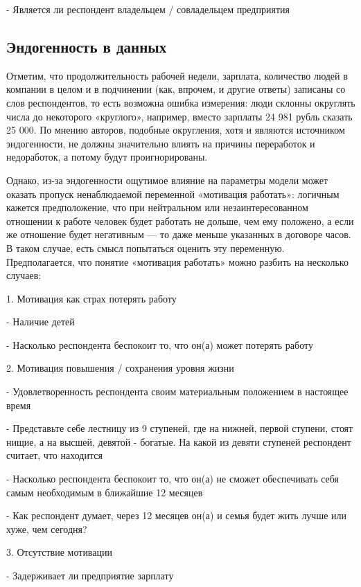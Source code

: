 \documentclass[12pt, a4paper]{article}
\begin{document}
{		-   Является ли респондент владельцем / совладельцем предприятия
		
		\subsection{Эндогенность в данных}
		
		Отметим, что продолжительность рабочей недели, зарплата, количество людей в компании в целом и в подчинении (как, впрочем, и другие ответы) записаны со слов респондентов, то есть возможна ошибка измерения: люди склонны округлять числа до некоторого «круглого», например, вместо зарплаты 24 981 рубль сказать 25 000. По мнению авторов, подобные округления, хотя и являются источником эндогенности, не должны значительно влиять на причины переработок и недоработок, а потому будут проигнорированы. 
		
		Однако, из-за эндогенности ощутимое влияние на параметры модели может оказать пропуск ненаблюдаемой переменной «мотивация работать»: логичным кажется предположение, что при нейтральном или незаинтересованном отношении к работе человек будет работать не дольше, чем ему положено, а если же отношение будет негативным — то даже меньше указанных в договоре часов. В таком случае, есть смысл попытаться оценить эту переменную. Предполагается, что понятие «мотивация работать» можно разбить на несколько случаев:
		
		1.  Мотивация как страх потерять работу
		
		-   Наличие детей
		
		-   Насколько респондента беспокоит то, что он(а) может потерять работу
		
		2.  Мотивация повышения / сохранения уровня жизни
		
		-   Удовлетворенность респондента своим материальным положением в настоящее время
		
		-   Представьте себе лестницу из 9 ступеней, где на нижней, первой ступени, стоят нищие, а на высшей, девятой - богатые. На какой из девяти ступеней респондент считает, что находится
		
		-   Насколько респондента беспокоит то, что он(а) не сможет обеспечивать себя самым необходимым в ближайшие 12 месяцев
		
		-   Как респондент думает, через 12 месяцев он(а) и семья будет жить лучше или хуже, чем сегодня?
		
		3.  Отсутствие мотивации
		
		-   Задерживает ли предприятие зарплату
		
}
\end{document}
